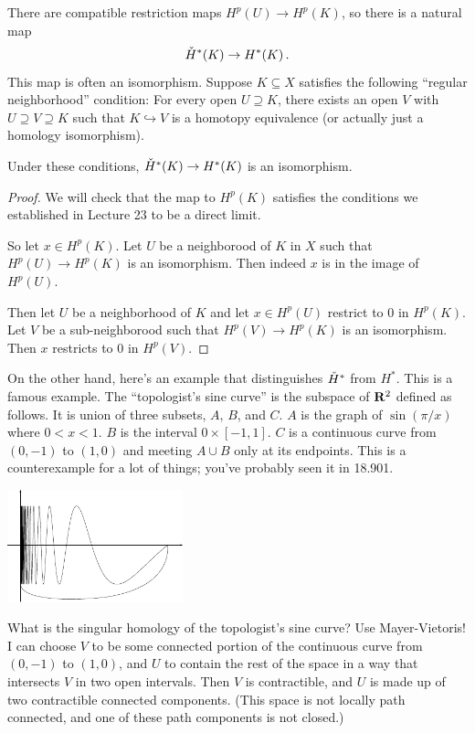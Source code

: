 There are compatible restriction maps $H^p(U)\to H^p(K)$, so there is a natural
map
\[
\check{H}^\ast(K)\to H^\ast(K)\,.
\]
This map is often an isomorphism. Suppose $K\subseteq X$ satisfies the following ``regular neighborhood'' condition: For every open $U\supseteq K$, there exists an open $V$ with $U\supseteq V\supseteq K$ such that $K\hookrightarrow V$ is a homotopy equivalence (or actually just a homology isomorphism).
\begin{lemma} Under these conditions, $\check{H}^\ast(K)\to H^\ast(K)$ is an isomorphism.
\end{lemma}
\begin{proof}
We will check that the map to $H^p(K)$ satisfies the conditions we established in Lecture 23 to be a direct limit. 

So let $x\in H^p(K)$. Let $U$ be a neighborood of $K$ in $X$ such that 
$H^p(U)\to H^p(K)$ is an isomorphism. Then indeed $x$ is in the image of
$H^p(U)$. 

Then let $U$ be a neighborhood of $K$ and let $x\in H^p(U)$ restrict to
0 in $H^p(K)$. Let $V$ be a sub-neighborood such that $H^p(V)\to H^p(K)$
is an isomorphism. Then $x$ restricts to 0 in $H^p(V)$.
\end{proof}

On the other hand, here's an example that distinguishes $\check{H}^\ast$ from $H^\ast$. This is a famous example. The ``topologist's sine curve'' is the subspace of $\mathbf R^2$ defined as follows. It is union of three
subsets, $A$, $B$, and $C$. $A$ is the graph of $\sin(\pi/x)$ where $0<x<1$.
$B$ is the interval $0\times[-1,1]$.  
$C$ is a continuous curve from $(0,-1)$ to $(1,0)$ and meeting $A\cup B$ 
only at its endpoints. 
This is a counterexample for a lot of things; you've probably seen it in 
18.901.

\medskip
\begin{center}
\includegraphics[width=2in]{905/Figures/34-topologists-sine-curve.pdf}
\end{center}

What is the singular homology of the topologist's sine curve? Use Mayer-Vietoris! I can choose $V$ to be some connected portion of the continuous curve from $(0,-1)$ to $(1,0)$, and $U$ to contain the rest of the space in a way that intersects $V$ in two open intervals. Then $V$ is contractible, and $U$ is made up of two contractible connected components. (This space is not locally path connected, and one of these path components is not closed.)


